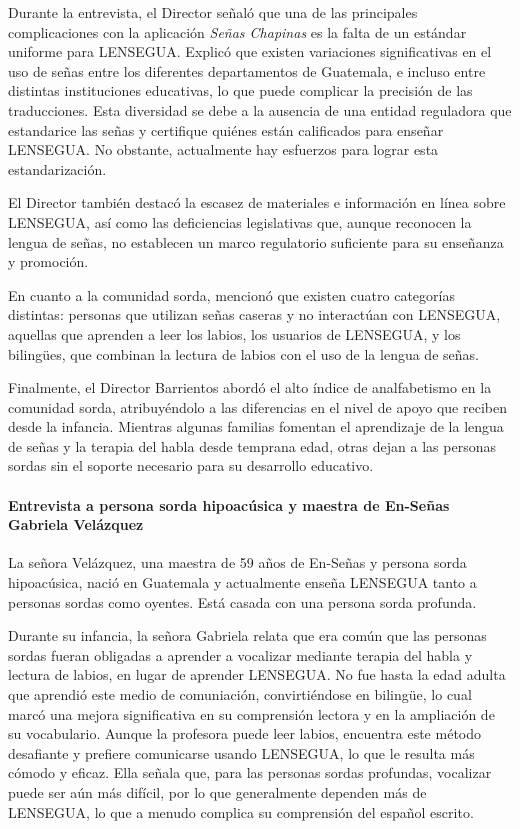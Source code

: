 Durante la entrevista, el Director señaló que una de las principales complicaciones con la aplicación \textit{Señas Chapinas} es la falta de un estándar uniforme para LENSEGUA. Explicó que existen variaciones significativas en el uso de señas entre los diferentes departamentos de Guatemala, e incluso entre distintas instituciones educativas, lo que puede complicar la precisión de las traducciones. Esta diversidad se debe a la ausencia de una entidad reguladora que estandarice las señas y certifique quiénes están calificados para enseñar LENSEGUA. No obstante, actualmente hay esfuerzos para lograr esta estandarización.

El Director también destacó la escasez de materiales e información en línea sobre LENSEGUA, así como las deficiencias legislativas que, aunque reconocen la lengua de señas, no establecen un marco regulatorio suficiente para su enseñanza y promoción.

En cuanto a la comunidad sorda, mencionó que existen cuatro categorías distintas: personas que utilizan señas caseras y no interactúan con LENSEGUA, aquellas que aprenden a leer los labios, los usuarios de LENSEGUA, y los bilingües, que combinan la lectura de labios con el uso de la lengua de señas.

Finalmente, el Director Barrientos abordó el alto índice de analfabetismo en la comunidad sorda, atribuyéndolo a las diferencias en el nivel de apoyo que reciben desde la infancia. Mientras algunas familias fomentan el aprendizaje de la lengua de señas y la terapia del habla desde temprana edad, otras dejan a las personas sordas sin el soporte necesario para su desarrollo educativo.

\paragraph{Entrevista a persona sorda hipoacúsica y maestra de En-Señas Gabriela Velázquez}
La señora Velázquez, una maestra de 59 años de En-Señas y persona sorda hipoacúsica, nació en Guatemala y actualmente enseña LENSEGUA tanto a personas sordas como oyentes. Está casada con una persona sorda profunda. 

Durante su infancia, la señora Gabriela relata que era común que las personas sordas fueran obligadas a aprender a vocalizar mediante terapia del habla y lectura de labios, en lugar de aprender LENSEGUA. No fue hasta la edad adulta que aprendió este medio de comuniación, convirtiéndose en bilingüe, lo cual marcó una mejora significativa en su comprensión lectora y en la ampliación de su vocabulario. Aunque la profesora puede leer labios, encuentra este método desafiante y prefiere comunicarse usando LENSEGUA, lo que le resulta más cómodo y eficaz. Ella señala que, para las personas sordas profundas, vocalizar puede ser aún más difícil, por lo que generalmente dependen más de LENSEGUA, lo que a menudo complica su comprensión del español escrito.

